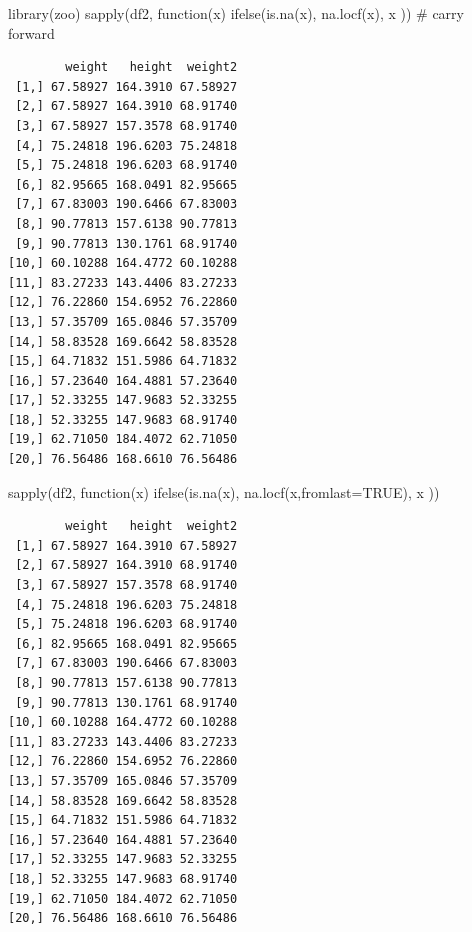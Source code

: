 \documentclass[
  letterpaper,
  DIV=11,
  numbers=noendperiod]{scrreprt}
\newenvironment{Shaded}{\begin{snugshade}}{\end{snugshade}}
\newcommand{\AttributeTok}[1]{\textcolor[rgb]{0.40,0.45,0.13}{#1}}
\newcommand{\CommentTok}[1]{\textcolor[rgb]{0.37,0.37,0.37}{#1}}
\newcommand{\ConstantTok}[1]{\textcolor[rgb]{0.56,0.35,0.01}{#1}}
\newcommand{\ControlFlowTok}[1]{\textcolor[rgb]{0.00,0.23,0.31}{#1}}
\newcommand{\FunctionTok}[1]{\textcolor[rgb]{0.28,0.35,0.67}{#1}}
\newcommand{\NormalTok}[1]{\textcolor[rgb]{0.00,0.23,0.31}{#1}}
\begin{document}
\begin{Shaded}
\begin{Highlighting}[]
\FunctionTok{library}\NormalTok{(zoo)}
\FunctionTok{sapply}\NormalTok{(df2, }\ControlFlowTok{function}\NormalTok{(x) }\FunctionTok{ifelse}\NormalTok{(}\FunctionTok{is.na}\NormalTok{(x), }\FunctionTok{na.locf}\NormalTok{(x), x )) }\CommentTok{\# carry forward}
\end{Highlighting}
\end{Shaded}

\begin{verbatim}
        weight   height  weight2
 [1,] 67.58927 164.3910 67.58927
 [2,] 67.58927 164.3910 68.91740
 [3,] 67.58927 157.3578 68.91740
 [4,] 75.24818 196.6203 75.24818
 [5,] 75.24818 196.6203 68.91740
 [6,] 82.95665 168.0491 82.95665
 [7,] 67.83003 190.6466 67.83003
 [8,] 90.77813 157.6138 90.77813
 [9,] 90.77813 130.1761 68.91740
[10,] 60.10288 164.4772 60.10288
[11,] 83.27233 143.4406 83.27233
[12,] 76.22860 154.6952 76.22860
[13,] 57.35709 165.0846 57.35709
[14,] 58.83528 169.6642 58.83528
[15,] 64.71832 151.5986 64.71832
[16,] 57.23640 164.4881 57.23640
[17,] 52.33255 147.9683 52.33255
[18,] 52.33255 147.9683 68.91740
[19,] 62.71050 184.4072 62.71050
[20,] 76.56486 168.6610 76.56486
\end{verbatim}

\begin{Shaded}
\begin{Highlighting}[]
\FunctionTok{sapply}\NormalTok{(df2, }\ControlFlowTok{function}\NormalTok{(x) }\FunctionTok{ifelse}\NormalTok{(}\FunctionTok{is.na}\NormalTok{(x), }\FunctionTok{na.locf}\NormalTok{(x,}\AttributeTok{fromlast=}\ConstantTok{TRUE}\NormalTok{), x ))}
\end{Highlighting}
\end{Shaded}

\begin{verbatim}
        weight   height  weight2
 [1,] 67.58927 164.3910 67.58927
 [2,] 67.58927 164.3910 68.91740
 [3,] 67.58927 157.3578 68.91740
 [4,] 75.24818 196.6203 75.24818
 [5,] 75.24818 196.6203 68.91740
 [6,] 82.95665 168.0491 82.95665
 [7,] 67.83003 190.6466 67.83003
 [8,] 90.77813 157.6138 90.77813
 [9,] 90.77813 130.1761 68.91740
[10,] 60.10288 164.4772 60.10288
[11,] 83.27233 143.4406 83.27233
[12,] 76.22860 154.6952 76.22860
[13,] 57.35709 165.0846 57.35709
[14,] 58.83528 169.6642 58.83528
[15,] 64.71832 151.5986 64.71832
[16,] 57.23640 164.4881 57.23640
[17,] 52.33255 147.9683 52.33255
[18,] 52.33255 147.9683 68.91740
[19,] 62.71050 184.4072 62.71050
[20,] 76.56486 168.6610 76.56486
\end{verbatim}
\end{document}
